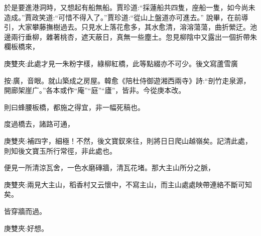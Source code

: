 \begin{parag}
    於是要進港洞時，又想起有船無船。賈珍道:“採蓮船共四隻，座船一隻，如今尚未造成。”賈政笑道:“可惜不得入了。”賈珍道:“從山上盤道亦可進去。” 說畢，在前導引，大家攀藤撫樹過去。只見水上落花愈多，其水愈清，溶溶蕩蕩，曲折縈迂。池邊兩行垂柳，雜著桃杏，遮天蔽日，真無一些塵土。忽見柳陰中又露出一個折帶朱欄板橋來，\begin{note}庚雙夾:此處才見一朱粉字樣，綠柳紅橋，此等點綴亦不可少。後文寫蘆雪廣\end{note}\begin{subnote}按:廣，音眼。就山築成之房屋。韓愈《陪杜侍御遊湘西兩寺》詩:“剖竹走泉源，開廊架崖广。”各本或作“庵”“庭”“廬”，皆非。今從庚本改。\end{subnote}\begin{note}則曰蜂腰板橋，都施之得宜，非一幅死稿也。\end{note}度過橋去，諸路可通，\begin{note}庚雙夾:補四字，細極！不然，後文寶釵來往，則將日日爬山越嶺矣。記清此處，則知後文寶玉所行常徑，非此處也。\end{note}便見一所清涼瓦舍，一色水磨磚牆，清瓦花堵。那大主山所分之脈，\begin{note}庚雙夾:兩見大主山，稻香村又云懷中，不寫主山，而主山處處映帶連絡不斷可知矣。\end{note}皆穿牆而過。\begin{note}庚雙夾:好想。\end{note}
\end{parag}


